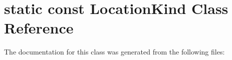\hypertarget{classstatic_01const_01LocationKind}{}\section{static const Location\+Kind Class Reference}
\label{classstatic_01const_01LocationKind}


The documentation for this class was generated from the following files\+: